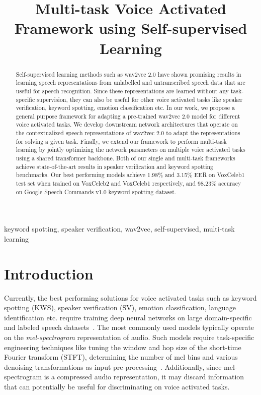 \documentclass{article}
\title{Multi-task Voice Activated Framework using Self-supervised Learning}
\begin{document}
\maketitle
\begin{abstract}
Self-supervised learning methods such as wav2vec 2.0 have shown promising results in learning speech representations from unlabelled and untranscribed speech data that are useful for speech recognition. 
Since these representations are learned without any task-specific supervision,
they can also be useful for other voice activated tasks like speaker verification, keyword spotting, emotion classification etc.
In our work, we propose a general purpose framework for adapting a pre-trained wav2vec 2.0 model for different voice activated tasks. We develop downstream network architectures that operate on the contextualized speech representations of wav2vec 2.0 to adapt the representations for solving a given task. 
Finally, we extend our framework to perform multi-task learning by jointly optimizing the network parameters on multiple voice activated tasks using a shared transformer backbone. 
Both of our single and multi-task frameworks achieve state-of-the-art results in speaker verification and keyword spotting benchmarks. Our best performing models achieve 1.98\% and 3.15\%  EER on VoxCeleb1 test set when trained on VoxCeleb2 and VoxCeleb1 respectively, and 98.23\% accuracy on Google Speech Commands v1.0 keyword spotting dataset. 
\end{abstract}
\begin{keywords}
keyword spotting, speaker verification, wav2vec, self-supervised, multi-task learning
\end{keywords}
\section{Introduction}
\label{sec:intro}
Currently, the best performing solutions for voice activated tasks such as keyword spotting (KWS), speaker verification (SV), emotion classification, language identification etc. require training deep neural networks on large domain-specific and labeled speech datasets~\cite{xie2019utterance,xiang2019margin,qualcommkwssota,cai2018exploring,jung2020improving}. The most commonly used models typically operate on the \textit{mel-spectrogram} representation of audio. Such models require task-specific engineering techniques like tuning the window and hop size of the short-time Fourier transform (STFT), determining the number of mel bins and various denoising transformations as input pre-processing~\cite{arias2021multi,dangol2020speech}. 
Additionally, since mel-spectrogram is a compressed audio representation, it may discard information that can potentially be useful for discriminating on voice activated tasks.
\end{document}
